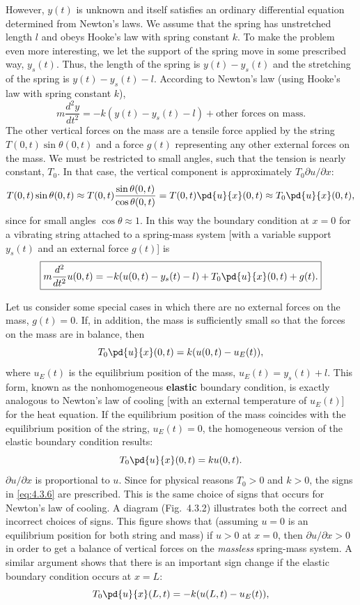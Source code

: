 However, $y(t)$ is unknown and itself satisfies an ordinary differential equation determined from Newton's laws.  We assume that the spring has unstretched length $l$ and obeys Hooke's law with spring constant $k$.  To make the problem even more interesting, we let the support of the spring move in some prescribed way, $y_s(t)$.  Thus, the length of the spring is $y(t) - y_s(t)$ and the stretching of the spring is $y(t) - y_s(t) - l$.  According to Newton's law (using Hooke's law with spring constant $k$),
\[
m\frac{d^2 y}{dt^2} = -k(y(t) - y_s(t) - l) + \text{other forces on mass.}
\]
The other vertical forces on the mass are a tensile force applied by the string $T(0,t)\sin\theta(0,t)$ and a force $g(t)$ representing any other external forces on the mass.  We must be restricted to small angles, such that the tension is nearly constant, $T_0$.  In that case, the vertical component is approximately $T_0\partial u/\partial x$:
\[
T(0,t)\sin\theta(0,t) \approx T(0,t)\frac{\sin\theta(0,t)}{\cos\theta(0,t)} = T(0,t)\pd{u}{x}(0,t) \approx T_0\pd{u}{x}(0,t),
\]
since for small angles $\cos\theta \approx 1$.  In this way the boundary condition at $x=0$ for a vibrating string attached to a spring-mass system [with a variable support $y_s(t)$ and an external force $g(t)$] is
\begin{equation}
\boxed{m\frac{d^2}{dt^2}u(0,t) = -k(u(0,t) - y_s(t) - l) + T_0\pd{u}{x}(0,t) + g(t).}
\label{eq:4.3.4}
\end{equation}

Let us consider some special cases in which there are no external forces on the mass, $g(t)=0$.  If, in addition, the mass is sufficiently small so that the forces on the mass are in balance, then
\begin{equation}
T_0\pd{u}{x}(0,t) = k(u(0,t) - u_E(t)),
\label{eq:4.3.5}
\end{equation}
where $u_E(t)$ is the equilibrium position of the mass, $u_E(t) = y_s(t) + l$.  This form, known as the nonhomogeneous \textbf{elastic} boundary condition, is exactly analogous to Newton's law of cooling [with an external temperature of $u_E(t)$] for the heat equation.  If the equilibrium position of the mass coincides with the equilibrium position of the string, $u_E(t) = 0$, the homogeneous version of the elastic boundary condition results:
\begin{equation}
T_0\pd{u}{x}(0,t) = ku(0,t).
\label{eq:4.3.6}
\end{equation}
$\partial u/\partial x$ is proportional to $u$.  Since for physical reasons $T_0 > 0$ and $k > 0$, the signs in \eqref{eq:4.3.6} are prescribed.  This is the same choice of signs that occurs for Newton's law of cooling.  A diagram (Fig.~4.3.2) illustrates both the correct and incorrect choices of signs.  This figure shows that (assuming $u=0$ is an equilibrium position for both string and mass) if $u > 0$ at $x = 0$, then $\partial u/\partial x > 0$ in order to get a balance of vertical forces on the \emph{massless} spring-mass system.  A similar argument shows that there is an important sign change if the elastic boundary condition occurs at $x = L$:
\begin{equation}
T_0\pd{u}{x}(L,t) = -k(u(L,t) - u_E(t)),
\label{eq:4.3.7}
\end{equation}

